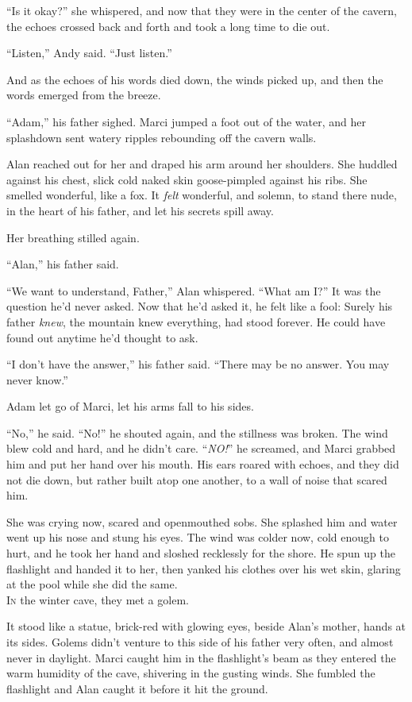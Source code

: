 ``Is it okay?'' she whispered, and now that they were in the center of
the cavern, the echoes crossed back and forth and took a long time to
die out.

``Listen,'' Andy said.  ``Just listen.''

And as the echoes of his words died down, the winds picked up, and
then the words emerged from the breeze.

``Adam,'' his father sighed.  Marci jumped a foot out of the water,
and her splashdown sent watery ripples rebounding off the cavern
walls.

Alan reached out for her and draped his arm around her shoulders.  She
huddled against his chest, slick cold naked skin goose-pimpled against
his ribs.  She smelled wonderful, like a fox.  It \textit{felt}
wonderful, and solemn, to stand there nude, in the heart of his
father, and let his secrets spill away.

Her breathing stilled again.

``Alan,'' his father said.

``We want to understand, Father,'' Alan whispered.  ``What am I?'' It
was the question he'd never asked.  Now that he'd asked it, he felt
like a fool:  Surely his father \textit{knew}, the mountain knew
everything, had stood forever.  He could have found out anytime he'd
thought to ask.

``I don't have the answer,'' his father said.  ``There may be no
answer.  You may never know.''

Adam let go of Marci, let his arms fall to his sides.

``No,'' he said.  ``No!'' he shouted again, and the stillness was
broken.  The wind blew cold and hard, and he didn't care. 
``\textit{NO!}'' he screamed, and Marci grabbed him and put her hand
over his mouth.  His ears roared with echoes, and they did not die
down, but rather built atop one another, to a wall of noise that
scared him.

She was crying now, scared and openmouthed sobs.  She splashed him and
water went up his nose and stung his eyes.  The wind was colder now,
cold enough to hurt, and he took her hand and sloshed recklessly for
the shore.  He spun up the flashlight and handed it to her, then
yanked his clothes over his wet skin, glaring at the pool while she
did the same.
\\
\lettrine[lines=3, lhang=.5, nindent=0pt, findent=2pt]{I}{n} the winter cave, they met a golem.

It stood like a statue, brick-red with glowing eyes, beside Alan's
mother, hands at its sides.  Golems didn't venture to this side of his
father very often, and almost never in daylight.  Marci caught him in
the flashlight's beam as they entered the warm humidity of the cave,
shivering in the gusting winds.  She fumbled the flashlight and Alan
caught it before it hit the ground.

